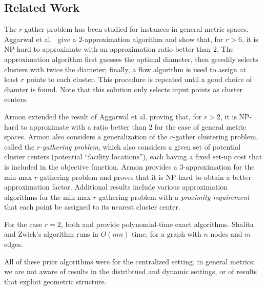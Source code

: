 
\subsection{Related Work}

The $r$-gather problem has been studied for instances in general metric spaces.  Aggarwal et al.~\cite{Aggarwal06achievinganonymity} give a $2$-approximation algorithm and show that, for $r>6$, it is NP-hard to approximate with an approximation ratio better than $2$.  The approximation algorithm first guesses the optimal diameter, then greedily selects clusters with twice the diameter; finally, a flow algorithm is used to assign at least $r$ points to each cluster.  This procedure is repeated until a good choice of diamter is found.  Note that this solution only selects input points as cluster centers.

Armon \cite{armon2011min} extended the result of Aggarwal et al. proving that, for $r>2$, it is NP-hard to approximate with a ratio better than $2$ for the case of general metric spaces.  Armon also considers a generalization of the $r$-gather clustering problem, called the {\em $r$-gathering problem}, which also considers a given set of potential cluster centers (potential ``facility locations''), each having a fixed set-up cost that is included in the objective function. Armon provides a $3$-approximation for the min-max $r$-gathering problem and proves that it is NP-hard to obtain a better approximation factor.  Additional results include various approximation algorithms for the min-max $r$-gathering problem with a {\em proximity requirement} that each point be assigned to its nearest cluster center.

For the case $r = 2$, both \cite{anshelevich2011terminal} and \cite{shalita2010efficient} provide polynomial-time exact algorithms.  Shalita and Zwick's \cite{shalita2010efficient} algorithm runs in $O(mn)$ time, for a graph with $n$ nodes and $m$ edges.

All of these prior algorithms were for the centralized setting, in general metrics; we are not aware of results in the distribtued and dynamic settings, or of results that exploit geometric structure. 

